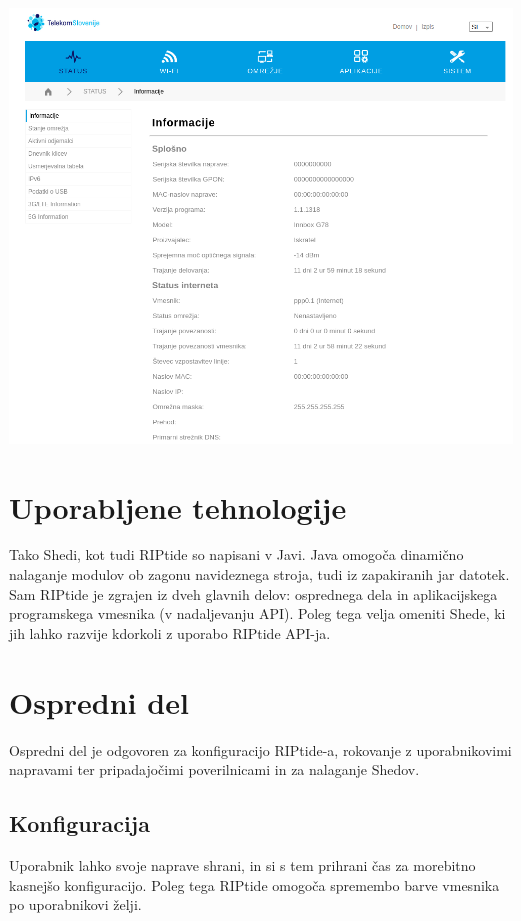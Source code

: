 \documentclass[12pt]{article}
\begin{document}
\begin{center}
	\includegraphics[scale=0.5]{slike/telekom.png}
\end{center}
\newpage

\section{Uporabljene tehnologije}
Tako Shedi, kot tudi RIPtide so napisani v Javi. Java omogoča dinamično
nalaganje modulov ob zagonu navideznega stroja, tudi iz zapakiranih jar
datotek. Sam RIPtide je zgrajen iz dveh glavnih delov: osprednega dela 
in aplikacijskega programskega vmesnika (v nadaljevanju API).
Poleg tega velja omeniti Shede, ki jih lahko razvije kdorkoli z uporabo
RIPtide API-ja.
\newpage

\section{Ospredni del}
Ospredni del je odgovoren za konfiguracijo RIPtide-a, rokovanje z 
uporabnikovimi napravami ter pripadajočimi poverilnicami in za
nalaganje Shedov.

\subsection{Konfiguracija}
Uporabnik lahko svoje naprave shrani, in si s tem prihrani čas za morebitno
kasnejšo konfiguracijo. Poleg tega RIPtide omogoča spremembo barve vmesnika
po uporabnikovi želji.
\end{document}
